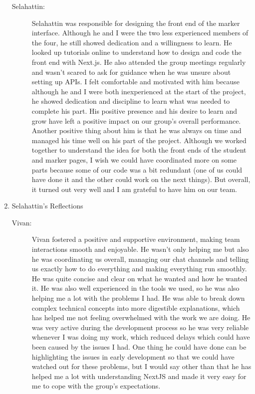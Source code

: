 \documentclass[a4paper, 12pt]{article}
\begin{document}
\begin{enumerate}
\begin{description}
            \item[Selahattin: ] Selahattin was responsible for designing the front end of the marker interface. Although he and I were the two less experienced members of the four, he still showed dedication and a willingness to learn. He looked up tutorials online to understand how to design and code the front end with Next.js. He also attended the group meetings regularly and wasn’t scared to ask for guidance when he was unsure about setting up APIs. I felt comfortable and motivated with him because although he and I were both inexperienced at the start of the project, he showed dedication and discipline to learn what was needed to complete his part. His positive presence and his desire to learn and grow have left a positive impact on our group’s overall performance. Another positive thing about him is that he was always on time and managed his time well on his part of the project. Although we worked together to understand the idea for both the front ends of the student and marker pages, I wish we could have coordinated more on some parts because some of our code was a bit redundant (one of us could have done it and the other could work on the next things). But overall, it turned out very well and I am grateful to have him on our team.
        \end{description}
    \item Selahattin's Reflections
        \begin{description}
            \item[Vivan: ] Vivan fostered a positive and supportive environment, making team interactions smooth and enjoyable. He wasn’t only helping me but also he was coordinating us overall, managing our chat channels and telling us exactly how to do everything and making everything run smoothly. He was quite concise and clear on what he wanted and how he wanted it. He was also well experienced in the tools we used, so he was also helping me a lot with the problems I had. He was able to break down complex technical concepts into more digestible explanations, which has helped me not feeling overwhelmed with the work we are doing. He was very active during the development process so he was very reliable whenever I was doing my work, which reduced delays which could have been caused by the issues I had. One thing he could have done can be highlighting the issues in early development so that we could have watched out for these problems, but I would say other than that he has helped me a lot with understanding NextJS and made it very easy for me to cope with the group’s expectations.

\end{description}
\end{enumerate}
\end{document}
